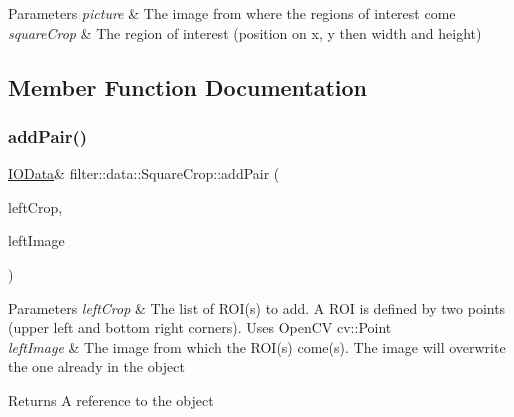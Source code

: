 \begin{DoxyParams}{Parameters}
{\em picture} & The image from where the regions of interest come \\
\hline
{\em square\+Crop} & The region of interest (position on x, y then width and height) \\
\hline
\end{DoxyParams}


\subsection{Member Function Documentation}
\mbox{\label{classfilter_1_1data_1_1_square_crop_abb6485dde249188c27ff3b339ea93067}} 
\subsubsection{\texorpdfstring{add\+Pair()}{addPair()}}
{\footnotesize\ttfamily \hyperlink{classfilter_1_1data_1_1_i_o_data}{I\+O\+Data}\& filter\+::data\+::\+Square\+Crop\+::add\+Pair (\begin{DoxyParamCaption}\item[{const std\+::vector$<$ cv\+::\+Point $>$ \&}]{left\+Crop,  }\item[{const \hyperlink{classfilter_1_1data_1_1_image_data}{Image\+Data} \&}]{left\+Image }\end{DoxyParamCaption})\hspace{0.3cm}{\ttfamily [inline]}}


\begin{DoxyParams}{Parameters}
{\em left\+Crop} & The list of R\+O\+I(s) to add. A R\+OI is defined by two points (upper left and bottom right corners). Uses Open\+CV cv\+::\+Point \\
\hline
{\em left\+Image} & The image from which the R\+O\+I(s) come(s). The image will overwrite the one already in the object \\
\hline
\end{DoxyParams}
\begin{DoxyReturn}{Returns}
A reference to the object 
\end{DoxyReturn}
\mbox{\label{classfilter_1_1data_1_1_square_crop_a066e7ca77734e652eed3943b448db2b6}} 
